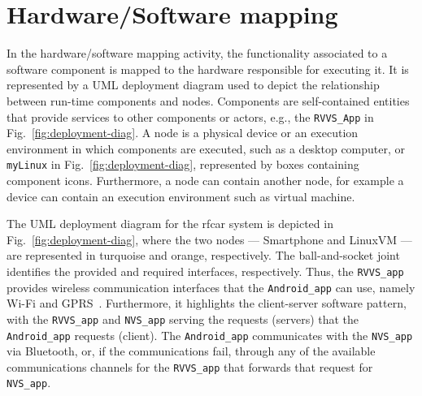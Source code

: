 \section{Hardware/Software mapping}%
\label{sec:hw-sw-mapping}
In the hardware/software mapping activity, the functionality associated to a
software component is mapped to the hardware responsible for executing it. It is
represented by a UML deployment diagram used to depict the relationship between
run-time components and nodes.
Components are self-contained entities that
provide services to other components or actors, e.g., the \texttt{RVVS\_App} in
Fig.~\ref{fig:deployment-diag}.
A node is a physical device or an execution environment in which components are
executed, such as a desktop computer, or \texttt{myLinux} in Fig.~\ref{fig:deployment-diag}, represented by boxes containing
component icons. Furthermore, a node can contain another node, for example a
device can contain an execution environment such as virtual machine.

The UML deployment diagram for the \gls{rfcar} system is depicted in
Fig.~\ref{fig:deployment-diag}, where the two nodes --- Smartphone and LinuxVM
--- are represented in turquoise and orange, respectively. The ball-and-socket
joint identifies the provided and required interfaces, respectively. Thus, the
\texttt{RVVS\_app} provides wireless communication interfaces that the
\texttt{Android\_app} can use, namely Wi-Fi and GPRS~.
Furthermore, it highlights the client-server software pattern, with the
\texttt{RVVS\_app} and \texttt{NVS\_app} serving the requests (servers) that the
\texttt{Android\_app} requests (client).
The \texttt{Android\_app} communicates with the \texttt{NVS\_app} via Bluetooth,
or, if the communications fail, through any of the available communications
channels for the \texttt{RVVS\_app} that forwards that request for
\texttt{NVS\_app}.

